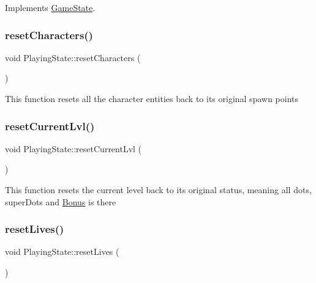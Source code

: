 Implements \hyperlink{class_game_state_aa14eeaf244bcf19b7013af75cb722dde}{Game\+State}.

\mbox{\label{class_playing_state_ac1d69f92915e66c4335c6218c0837179}} 
\subsubsection{\texorpdfstring{reset\+Characters()}{resetCharacters()}}
{\footnotesize\ttfamily void Playing\+State\+::reset\+Characters (\begin{DoxyParamCaption}{ }\end{DoxyParamCaption})}

This function resets all the character entities back to its original spawn points \mbox{\label{class_playing_state_a11a3e0a2d479e659c442deb9c87fdeed}} 
\subsubsection{\texorpdfstring{reset\+Current\+Lvl()}{resetCurrentLvl()}}
{\footnotesize\ttfamily void Playing\+State\+::reset\+Current\+Lvl (\begin{DoxyParamCaption}{ }\end{DoxyParamCaption})}

This function resets the current level back to its original status, meaning all dots, super\+Dots and \hyperlink{class_bonus}{Bonus} is there \mbox{\label{class_playing_state_a464c879dc893195b041efa58b3b3e73f}} 
\subsubsection{\texorpdfstring{reset\+Lives()}{resetLives()}}
{\footnotesize\ttfamily void Playing\+State\+::reset\+Lives (\begin{DoxyParamCaption}{ }\end{DoxyParamCaption})}

